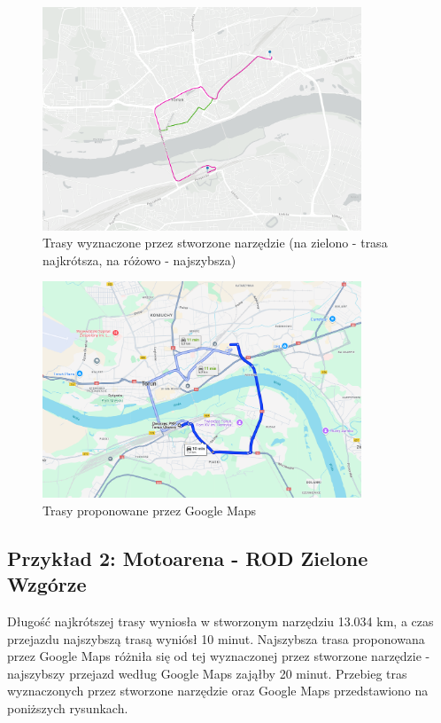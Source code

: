 \documentclass{article}
\begin{document}
\begin{figure}[H]
    \centering
    \includegraphics[width=0.85\textwidth]{img/glowny-copernicus.png}
    \caption{Trasy wyznaczone przez stworzone narzędzie (na zielono - trasa najkrótsza, na różowo - najszybsza)}
\end{figure}

\begin{figure}[H]
    \centering
    \includegraphics[width=0.85\textwidth]{img/glowny-copernicus-google.png}
    \caption{Trasy proponowane przez Google Maps}
\end{figure}

\newpage
\subsection{Przykład 2: Motoarena - ROD Zielone Wzgórze}
Długość najkrótszej trasy wyniosła w stworzonym narzędziu 13.034 km, a czas przejazdu najszybszą trasą wyniósł 10 minut. Najszybsza trasa proponowana przez Google Maps różniła się od tej wyznaczonej przez stworzone narzędzie - najszybszy przejazd według Google Maps zająłby 20 minut.
Przebieg tras wyznaczonych przez stworzone narzędzie oraz Google Maps przedstawiono na poniższych rysunkach.
\end{document}
